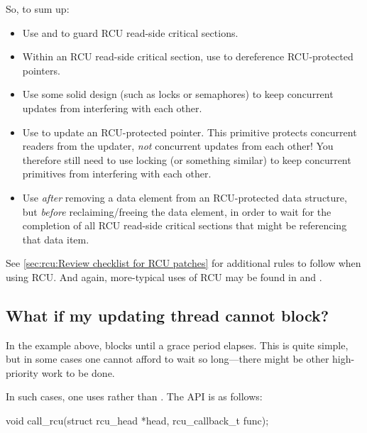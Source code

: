 So, to sum up:

\begin{itemize}
\item	Use  and  to guard RCU
	read-side critical sections.

\item	Within an RCU read-side critical section, use 
	to dereference RCU-protected pointers.

\item	Use some solid design (such as locks or semaphores) to
	keep concurrent updates from interfering with each other.

\item	Use  to update an RCU-protected pointer.
	This primitive protects concurrent readers from the updater,
	\emph{not} concurrent updates from each other!
	You therefore still
	need to use locking (or something similar) to keep concurrent
	 primitives from interfering with each other.

\item	Use  \emph{after} removing a data element from an
	RCU-protected data structure, but \emph{before} reclaiming/freeing
	the data element, in order to wait for the completion of all
	RCU read-side critical sections that might be referencing that
	data item.
\end{itemize}

See \cref{sec:rcu:Review checklist for RCU patches}
for additional rules to follow when using RCU\@.
And again, more-typical uses of RCU may be found in 
and .


\subsection{What if my updating thread cannot block?}
\label{sec:rcu:What if my updating thread cannot block?}

In the example above,  blocks until a grace period elapses.
This is quite simple, but in some cases one cannot afford to wait so
long---there might be other high-priority work to be done.

In such cases, one uses  rather than .
The  API is as follows:

\begin{VerbatimU}
	void call_rcu(struct rcu_head *head, rcu_callback_t func);
\end{VerbatimU}

